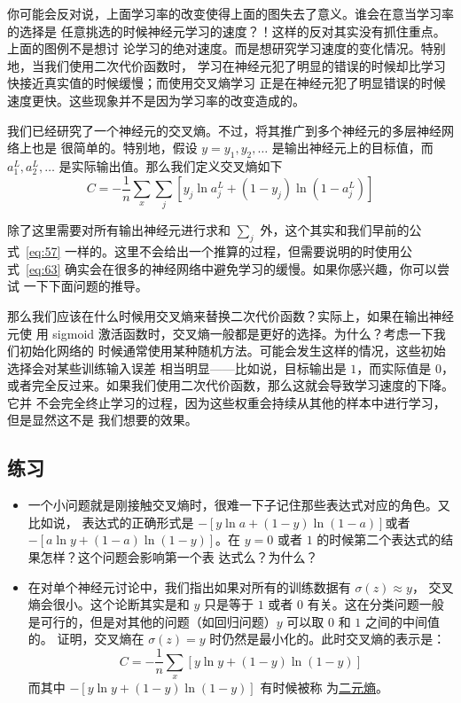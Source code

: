 你可能会反对说，上面学习率的改变使得上面的图失去了意义。谁会在意当学习率的选择是
任意挑选的时候神经元学习的速度？！这样的反对其实没有抓住重点。上面的图例不是想讨
论学习的绝对速度。而是想研究学习速度的变化情况。特别地，当我们使用二次代价函数时，
学习在神经元犯了明显的错误的时候却比学习快接近真实值的时候缓慢；而使用交叉熵学习
正是在神经元犯了明显错误的时候速度更快。这些现象并不是因为学习率的改变造成的。

我们已经研究了一个神经元的交叉熵。不过，将其推广到多个神经元的多层神经网络上也是
很简单的。特别地，假设 $y = y_1, y_2, \ldots$ 是输出神经元上的目标值，而 $a^L_1,
a^L_2, \ldots$ 是实际输出值。那么我们定义交叉熵如下
\begin{equation}
  C = -\frac{1}{n} \sum_x \sum_j \left[y_j \ln a^L_j + (1-y_j) \ln (1-a^L_j) \right]
  \label{eq:63}\tag{63}
\end{equation}

除了这里需要对所有输出神经元进行求和 $\sum_j$ 外，这个其实和我们早前的公
式~\eqref{eq:57} 一样的。这里不会给出一个推算的过程，但需要说明的时使用公
式~\eqref{eq:63} 确实会在很多的神经网络中避免学习的缓慢。如果你感兴趣，你可以尝试
一下下面问题的推导。

那么我们应该在什么时候用交叉熵来替换二次代价函数？实际上，如果在输出神经元使
用 sigmoid 激活函数时，交叉熵一般都是更好的选择。为什么？考虑一下我们初始化网络的
时候通常使用某种随机方法。可能会发生这样的情况，这些初始选择会对某些训练输入误差
相当明显——比如说，目标输出是 $1$，而实际值是
$0$，或者完全反过来。如果我们使用二次代价函数，那么这就会导致学习速度的下降。它并
不会完全终止学习的过程，因为这些权重会持续从其他的样本中进行学习，但是显然这不是
我们想要的效果。

\subsection*{练习}

\begin{itemize}
\item 一个小问题就是刚接触交叉熵时，很难一下子记住那些表达式对应的角色。又比如说，
  表达式的正确形式是 $-[y \ln a + (1-y) \ln (1-a)]$或者 $-[a \ln y + (1-a) \ln
  (1-y)]$。在 $y=0$ 或者 $1$ 的时候第二个表达式的结果怎样？这个问题会影响第一个表
  达式么？为什么？
\item 在对单个神经元讨论中，我们指出如果对所有的训练数据有 $\sigma(z) \approx y$，
  交叉熵会很小。这个论断其实是和 $y$ 只是等于 $1$ 或者 $0$ 有关。这在分类问题一般
  是可行的，但是对其他的问题（如回归问题）$y$ 可以取 $0$ 和 $1$ 之间的中间值的。
  证明，交叉熵在 $\sigma(z) = y$ 时仍然是最小化的。此时交叉熵的表示是：
  \begin{equation}
    C = -\frac{1}{n} \sum_x [y \ln y+(1-y) \ln(1-y)]
    \label{eq:64}\tag{64}
  \end{equation}
  而其中 $-[y \ln y+(1-y)\ln(1-y)]$ 有时候被称
  为\href{http://en.wikipedia.org/wiki/Binary_entropy_function}{二元熵}。
\end{itemize}

